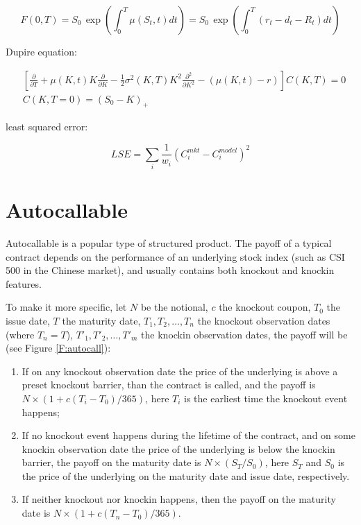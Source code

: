 \[
	F(0,T) = S_0 \, \exp \left( \int_0^T \mu(S_t,t) dt \right)
	       = S_0 \, \exp \left( \int_0^T (r_t - d_t - R_t) dt \right)
\]

Dupire equation:

\begin{align*}
	& \left[
	\frac{\partial}{\partial T} + \mu(K,t) K\frac{\partial}{\partial K}
	- \frac{1}{2} \sigma^2(K,T) K^2 \frac{\partial^2}{\partial K^2} 
	- (\mu(K,t) - r)
	\right] C(K,T) = 0  \\
	& C(K,T=0) = (S_0 - K)_+
\end{align*}

least squared error:

\[
	LSE = \sum_i \frac{1}{w_i} (C_i^{mkt} - C_i^{model})^2
\]


\section{Autocallable}

Autocallable is a popular type of structured product. The payoff of a typical 
contract depends on the performance of an underlying stock index (such as
CSI 500 in the Chinese market), and usually contains both knockout and knockin 
features.

To make it more specific, 
let $N$ be the notional, $c$ the knockout coupon, $T_0$ the issue date, $T$
the maturity date, $T_1,T_2,\dots,T_n$ the knockout observation dates (where
$T_n=T$), $T'_1,T'_2,\dots,T'_m$ the knockin observation dates, 
the payoff will be (see Figure \ref{F:autocall}):

\begin{enumerate}
\item If on any knockout observation date the price of the underlying is above a
preset knockout barrier, than the contract is called, and the payoff is
$N\times(1+c(T_i-T_0)/365)$, here $T_i$ is the earliest time the knockout event
happens;
\item If no knockout event happens during the lifetime of the contract, and on
some knockin observation date the price of the underlying is below the knockin
barrier, the payoff on the maturity date is $N\times(S_T/S_0)$, here $S_T$ and
$S_0$ is the price of the underlying on the maturity date and issue date,
respectively.
\item If neither knockout nor knockin happens, then the payoff on the maturity
date is $N\times(1+c(T_n-T_0)/365)$. 
\end{enumerate}


